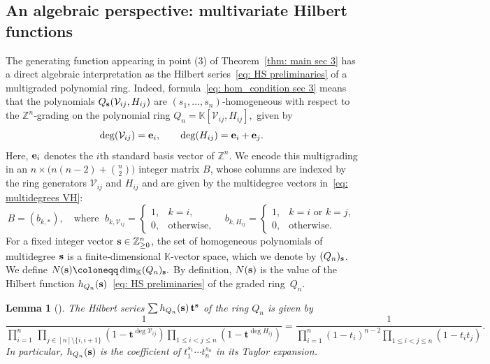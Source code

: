 \documentclass[12pt,a4paper]{extarticle}
\newtheorem{lemma}[theorem]{Lemma}
\theoremstyle{definition}
\newcommand{\K}{\mathbb{K}}
\begin{document}
\subsection{An algebraic perspective: multivariate Hilbert functions}\label{per: alg}
The generating function appearing in point (3) of Theorem~\ref{thm: main sec 3}
has a direct algebraic interpretation as the Hilbert series~\eqref{eq: HS preliminaries} of a multigraded polynomial ring.
Indeed, formula~\eqref{eq: hom_condition sec 3} means that the polynomials
$Q_{\bf s}(\mathcal{V}_{ij}, H_{ij})$ are $(s_1,\ldots,s_n)$‑homogeneous with respect to the
$\mathbb{Z}^n$‑grading on the polynomial ring
$
Q_n = \K[\mathcal{V}_{ij}, H_{ij}],
$
given by
\begin{equation}\label{eq: multidegrees VH}
\deg(\mathcal{V}_{ij}) = {\bf e}_i,
\qquad
\deg(H_{ij}) = {\bf e}_i + {\bf e}_j.
\end{equation}
Here, ${\bf e}_i$ denotes the $i$th standard basis vector of $\mathbb{Z}^n$.
We encode this multigrading in an
$n \times \bigl(n(n-2)+\binom{n}{2}\bigr)$ integer matrix $B$,
whose columns are indexed by the ring generators $\mathcal{V}_{ij}$ and $H_{ij}$ and are given by
the multidegree vectors in~\eqref{eq: multidegrees VH}:
\begin{equation}\label{eq:matB}
B = (b_{k,*}), \quad \text{where } \;
b_{k,\mathcal{V}_{ij}} =
\begin{cases}
1, & k=i,\\
0, & \text{otherwise},
\end{cases}
\quad
b_{k,H_{ij}} =
\begin{cases}
1, & k=i \text{ or } k=j,\\
0, & \text{otherwise}.
\end{cases}
\end{equation}
For a fixed integer vector ${\bf s}\in\mathbb{Z}_{\ge0}^n$, the set of homogeneous polynomials of multidegree ${\bf s}$
is a finite‑dimensio\-nal $\K$‑vector space, which we denote by $(Q_n)_{\bf s}$. We define
$
N({\bf s}) \coloneqq \dim_\K (Q_n)_{\bf s}.
$
By definition, $N({\bf s})$ is the value of the Hilbert function $h_{Q_n}({\bf s})$~\eqref{eq: HS preliminaries} of the graded ring~$Q_n$.
\begin{lemma}[{\cite[Lem.~8.16]{CCA}}] \label{lem:MHS}
The Hilbert series $\sum  h_{Q_n}({\bf s})\, {\bf t}^{\bf s}$ of the ring $Q_n$ is given by
\begin{equation}\label{eq: HS conformal}
    \dfrac{1}{\prod\limits_{i=1}^n \,\prod\limits_{j\in[n]\setminus\{i,i+1\}} (1-\mathbf{t}^{\deg \mathcal{V}_{ij}}) \prod\limits_{1\leq i<j\leq n} (1-\mathbf{t}^{\deg H_{ij}})} =
\frac{1}{\prod\limits_{i=1}^n (1-t_i)^{n-2}
\prod\limits_{1\le i<j\le n} (1-t_i t_j)}.
\end{equation}
In particular, $h_{Q_n}({\bf s})$ is  the coefficient of
$t_1^{s_1}\cdots t_n^{s_n}$ in its Taylor expansion.
\end{lemma}
\end{document}
